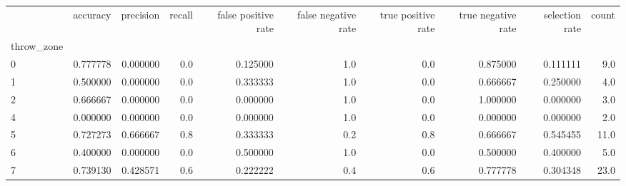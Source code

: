 \begin{tabular}{lrrrrrrrrr}
\toprule
{} &  accuracy &  precision &  recall &  false positive rate &  false negative rate &  true positive rate &  true negative rate &  selection rate &  count \\
throw\_zone &           &            &         &                      &                      &                     &                     &                 &        \\
\midrule
0          &  0.777778 &   0.000000 &     0.0 &             0.125000 &                  1.0 &                 0.0 &            0.875000 &        0.111111 &    9.0 \\
1          &  0.500000 &   0.000000 &     0.0 &             0.333333 &                  1.0 &                 0.0 &            0.666667 &        0.250000 &    4.0 \\
2          &  0.666667 &   0.000000 &     0.0 &             0.000000 &                  1.0 &                 0.0 &            1.000000 &        0.000000 &    3.0 \\
4          &  0.000000 &   0.000000 &     0.0 &             0.000000 &                  1.0 &                 0.0 &            0.000000 &        0.000000 &    2.0 \\
5          &  0.727273 &   0.666667 &     0.8 &             0.333333 &                  0.2 &                 0.8 &            0.666667 &        0.545455 &   11.0 \\
6          &  0.400000 &   0.000000 &     0.0 &             0.500000 &                  1.0 &                 0.0 &            0.500000 &        0.400000 &    5.0 \\
7          &  0.739130 &   0.428571 &     0.6 &             0.222222 &                  0.4 &                 0.6 &            0.777778 &        0.304348 &   23.0 \\
\bottomrule
\end{tabular}
